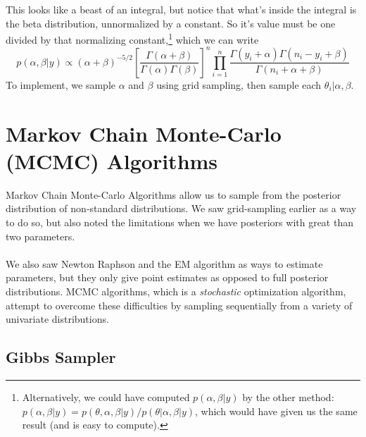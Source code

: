 \documentclass[12pt]{article}
\begin{document}
This looks like a beast of an integral, but notice that what's inside 
the integral is the beta distribution, unnormalized by a constant. So
it's value must be one divided by that normalizing constant,\footnote{
Alternatively, we could have computed $p(\alpha, \beta |y)$
by the other method: $p(\alpha, \beta | y) = 
p(\theta, \alpha, \beta | y)/p(\theta|\alpha, \beta | y)$, which
would have given us the same result (and is easy
to compute).} which we can write
\[ p(\alpha, \beta | y) \propto (\alpha + \beta)^{-5/2}
   \left[\frac{\Gamma(\alpha+\beta)}{\Gamma(\alpha) \Gamma(\beta)}
      \right]^n  \prod^n_{i=1} \frac{ \Gamma(y_i + \alpha) \Gamma(
      n_i - y_i + \beta)}{\Gamma(n_i + \alpha + \beta)} \]
To implement, we sample $\alpha$ and $\beta$ using grid sampling, 
then sample each $\theta_i | \alpha, \beta$.

\newpage
\section{Markov Chain Monte-Carlo (MCMC) Algorithms}

Markov Chain Monte-Carlo Algorithms allow us to sample from the 
posterior distribution of non-standard distributions. We saw 
grid-sampling earlier as a way to do so, but also noted the limitations
when we have posteriors with great than two parameters. 
\\
\\
We also saw Newton Raphson and the EM algorithm as ways to estimate
parameters, but they only give point estimates as opposed to full
posterior distributions.  MCMC algorithms, which is a \emph{stochastic}
optimization algorithm, attempt to overcome these difficulties
by sampling sequentially from a variety of univariate distributions.

\subsection{Gibbs Sampler}
\end{document}
